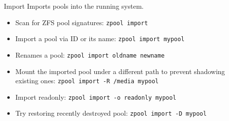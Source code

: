 \documentclass[10pt,landscape,letter]{article}
\begin{document}
\begin{multicols}{3}
\begin{Description}
    \item[Import] Imports pools into the running system.
      \begin{itemize}
        \item Scan for ZFS pool signatures: \texttt{zpool import}
        \item Import a pool via ID or its name: \texttt{zpool import mypool}
        \item Renames a pool: \texttt{zpool import oldname newname}
        \item Mount the imported pool under a different path to prevent
          shadowing existing ones: \texttt{zpool import -R /media mypool}
        \item Import readonly: \texttt{zpool import -o readonly mypool}
        \item Try restoring recently destroyed pool: \texttt{zpool import -D mypool}
      \end{itemize}
	\end{Description}


\end{multicols}
\end{document}
